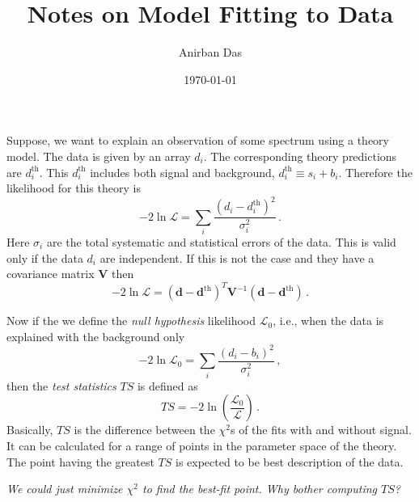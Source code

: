 \documentclass[11pt,aps,prd,onecolumn,floatfix, tightenlines,shownopacs,showkeys,preprintnumbers,nofootinbib, longbibliography,notitlepage]{revtex4-1}
\newcommand{\dth}{d^\mathrm{th}}
\newcommand{\lik}{\mathcal{L}}
\begin{document}
	\title{Notes on Model Fitting to Data}
	
	\author{Anirban Das}
	
	\bigskip
	
	\date{\today}
	
	\maketitle
	
	Suppose, we want to explain an observation of some spectrum using a theory model. The data is given by an array $d_i$. The corresponding theory predictions are $\dth_i$. This $\dth_i$ includes both signal and background, $\dth_i \equiv s_i + b_i$. Therefore the likelihood for this theory is
	\begin{equation}
	-2\ln\lik = \sum_i\dfrac{(d_i - \dth_i)^2}{\sigma_i^2}\,.
	\end{equation}
	Here $\sigma_i$ are the total systematic and statistical errors of the data. This is valid only if the data $d_i$ are independent. If this is not the case and they have a covariance matrix $\mathbf{V}$ then
	\begin{equation}
	-2\ln\lik = (\mathbf{d} - \mathbf{\dth})^T \mathbf{V}^{-1} (\mathbf{d} - \mathbf{\dth})\,.
	\end{equation}
	
	Now if the we define the \emph{null hypothesis} likelihood $\lik_0$, i.e., when the data is explained with the background only
	\begin{equation}
	-2\ln\lik_0 = \sum_i\dfrac{(d_i - b_i)^2}{\sigma_i^2}\,,
	\end{equation}
	then the \emph{test statistics} $TS$ is defined as
	\begin{equation}
	TS = -2\ln\left(\dfrac{\lik_0}{\lik}\right)\,.
	\end{equation}
	Basically, $TS$ is the difference between the $\chi^2$s of the fits with and without signal. It can be calculated for a range of points in the parameter space of the theory. The point having the greatest $TS$ is expected to be best description of the data.
	\bigskip
	
	\emph{We could just minimize $\chi^2$ to find the best-fit point. Why bother computing $TS$?}
	
\end{document}
